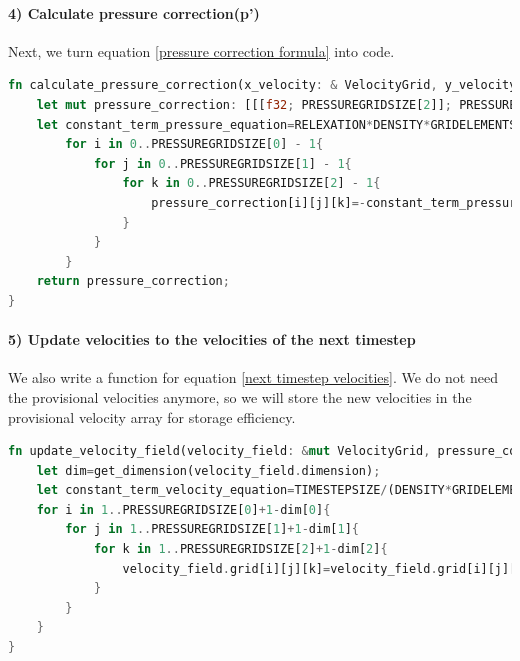 \documentclass{article}
\begin{document}
\paragraph{4) Calculate pressure correction(p')}

Next, we turn equation \ref{pressure correction formula} into code. 
\begin{lstlisting}[language=Rust, style=boxed, breaklines=true]
fn calculate_pressure_correction(x_velocity: & VelocityGrid, y_velocity: & VelocityGrid, z_velocity: & VelocityGrid)->[[[f32; PRESSUREGRIDSIZE[2]]; PRESSUREGRIDSIZE[1]]; PRESSUREGRIDSIZE[0]]{
    let mut pressure_correction: [[[f32; PRESSUREGRIDSIZE[2]]; PRESSUREGRIDSIZE[1]]; PRESSUREGRIDSIZE[0]]=[[[0.0; PRESSUREGRIDSIZE[2]]; PRESSUREGRIDSIZE[1]]; PRESSUREGRIDSIZE[0]];//Here we will store the pressure corrections.
    let constant_term_pressure_equation=RELEXATION*DENSITY*GRIDELEMENTSCALE/(6.0*TIMESTEPSIZE);//The lower part of the equation is this constant.
        for i in 0..PRESSUREGRIDSIZE[0] - 1{
            for j in 0..PRESSUREGRIDSIZE[1] - 1{
                for k in 0..PRESSUREGRIDSIZE[2] - 1{
                    pressure_correction[i][j][k]=-constant_term_pressure_equation*(x_velocity.grid[i+1][j+1][k+1] - x_velocity.grid[i][j+1][k+1]+ y_velocity.grid[i+1][j+1][k+1] - y_velocity.grid[i+1][j][k+1] + z_velocity.grid[i+1][j+1][k+1]-z_velocity.grid[i+1][j+1][k]);
                }
            }
        }
    return pressure_correction;
}
\end{lstlisting}

\paragraph{5) Update velocities to the velocities of the next timestep} 
We also write a function for equation \ref{next timestep velocities}. We do not need the provisional velocities anymore, so we will store the new velocities in the provisional velocity array for storage efficiency.

\begin{lstlisting}[language=Rust, style=boxed, breaklines=true]
fn update_velocity_field(velocity_field: &mut VelocityGrid, pressure_correction : &[[[f32; PRESSUREGRIDSIZE[2]]; PRESSUREGRIDSIZE[1]]; PRESSUREGRIDSIZE[0]]){
    let dim=get_dimension(velocity_field.dimension);
    let constant_term_velocity_equation=TIMESTEPSIZE/(DENSITY*GRIDELEMENTSCALE);
    for i in 1..PRESSUREGRIDSIZE[0]+1-dim[0]{
        for j in 1..PRESSUREGRIDSIZE[1]+1-dim[1]{
            for k in 1..PRESSUREGRIDSIZE[2]+1-dim[2]{
                velocity_field.grid[i][j][k]=velocity_field.grid[i][j][k]-constant_term_velocity_equation*(pressure_correction[i+dim[0]-1][j+dim[1]-1][k+dim[2]-1]- pressure_correction[i-1][j-1][k-1]);
            }
        }
    }
}
\end{lstlisting}
\end{document}
